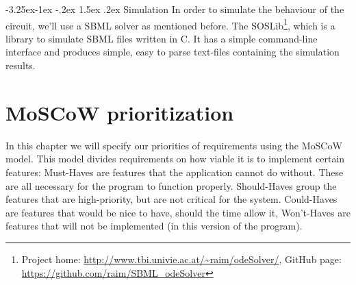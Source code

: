 \documentclass[a4paper]{article}
\makeatletter
\renewcommand\paragraph{\@startsection{paragraph}{4}{\z@}%
  {-3.25ex\@plus -1ex \@minus -.2ex}%
  {1.5ex \@plus .2ex}%
  {\normalfont\normalsize\bfseries}}
\makeatother
\begin{document}
\paragraph{Simulation}
In order to simulate the behaviour of the circuit, we'll use a SBML solver as mentioned before. The SOSLib\footnote{ Project home: \url{http://www.tbi.univie.ac.at/~raim/odeSolver/}, GitHub page: \url{https://github.com/raim/SBML_odeSolver}}, which is a library to simulate SBML files written in C. It has a simple command-line interface and produces simple, easy to parse text-files containing the simulation results.



\pagebreak
\section{MoSCoW prioritization}
In this chapter we will specify our priorities of requirements using the MoSCoW model. This model divides requirements on how viable it is to implement certain features: Must-Haves are features that the application cannot do without. These are all necessary for the program to function properly. Should-Haves group the features that are high-priority, but are not critical for the system. Could-Haves are features that would be nice to have, should the time allow it, Won't-Haves are features that will not be implemented (in this version of the program).
\end{document}
